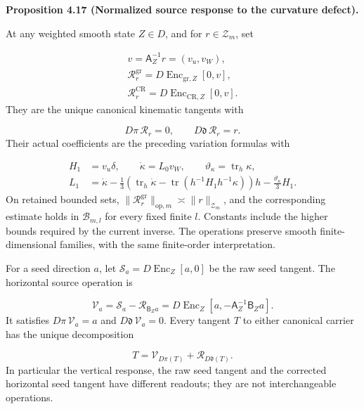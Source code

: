 \documentclass[
  english,
  11pt,
  reqno]{amsart}
\makeatletter
\newcommand{\pandocstatementheading}[1]{%
  \par\addpenalty{\@beginparpenalty}%
  \addvspace{.5\baselineskip plus .2\baselineskip minus .2\baselineskip}%
  {\normalfont\bfseries #1\par}%
  \nobreak\@afterindenttrue\@afterheading
}
\makeatother
\begin{document}
\pandocstatementheading{\leavevmode{}\label{prop:online-source-normalized-vertical-response}Proposition 4.17 (Normalized source response to the curvature defect).}

At any weighted smooth state \(Z\in D\), and for \(r\in\mathcal Z_m\),
set

\label{eq:online-source-vertical-response} \[
\begin{gathered}
v=\mathsf A_Z^{-1}r=(v_u,v_W), \\
\mathscr R_r^{\mathrm{gr}}
=D\operatorname{Enc}_{\mathrm{gr},Z}[0,v], \\
\mathscr R_r^{\mathrm{CR}}
=D\operatorname{Enc}_{\mathrm{CR},Z}[0,v].
\end{gathered}
\] They are the unique canonical kinematic tangents with

\label{eq:online-source-vertical-two-readouts} \[
D\pi\,\mathscr R_r=0,\qquad
D\mathfrak d\,\mathscr R_r=r.
\] Their actual coefficients are the preceding variation formulas with

\label{eq:online-source-vertical-tensor-response} \[
\begin{aligned}
H_1&=v_u\delta,\qquad \dot\kappa=L_0v_W,
\qquad \vartheta_\kappa=\operatorname{tr}_h\kappa,\\
L_1&=\dot\kappa
-\frac13\left(\operatorname{tr}_h\dot\kappa
-\operatorname{tr}(h^{-1}H_1h^{-1}\kappa)\right)h
-\frac{\vartheta_\kappa}{3}H_1.
\end{aligned}
\] On retained bounded sets,
\(\|\mathscr R_r^{\mathrm{gr}}\|_{\mathrm{op},m}\asymp\|r\|_{\mathcal Z_m}\),
and the corresponding estimate holds in \(\mathcal B_{m,l}\) for every
fixed finite \(l\). Constants include the higher bounds required by the
current inverse. The operations preserve smooth finite-dimensional
families, with the same finite-order interpretation.

For a seed direction \(a\), let
\(\mathscr S_a=D\operatorname{Enc}_Z[a,0]\) be the raw seed tangent. The
horizontal source operation is

\label{eq:online-source-current-horizontal-operation} \[
\mathscr V_a
=\mathscr S_a-\mathscr R_{\mathsf B_Za}
=D\operatorname{Enc}_Z[a,-\mathsf A_Z^{-1}\mathsf B_Za].
\] It satisfies \(D\pi\,\mathscr V_a=a\) and
\(D\mathfrak d\,\mathscr V_a=0\). Every tangent \(T\) to either
canonical carrier has the unique decomposition

\label{eq:online-source-two-readout-tangent-splitting} \[
T=\mathscr V_{D\pi(T)}+\mathscr R_{D\mathfrak d(T)}.
\] In particular the vertical response, the raw seed tangent and the
corrected horizontal seed tangent have different readouts; they are not
interchangeable operations.
\end{document}
